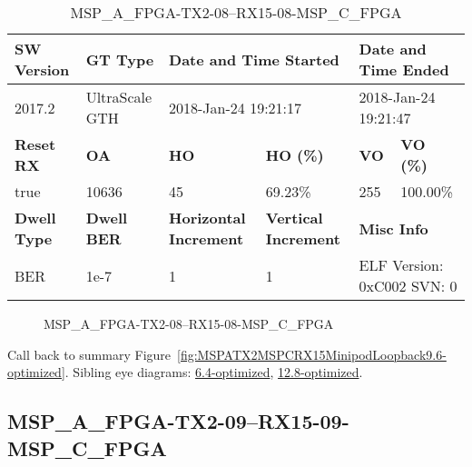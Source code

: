 \begin{table}[h]
\centering
\caption{MSP\_A\_FPGA-TX2-08--RX15-08-MSP\_C\_FPGA}
\label{tab:MSPAFPGATX208RX1508MSPCFPGA9.6-optimized}
\begin{tabular}{@{}|l|l|l|l|l|l|@{}}
\toprule
\textbf{SW Version}                & \textbf{GT Type}   & \multicolumn{2}{l|}{\textbf{Date and Time Started}}            & \multicolumn{2}{l|}{\textbf{Date and Time Ended}}        \\ \midrule
2017.2                       & UltraScale GTH          & \multicolumn{2}{l|}{2018-Jan-24 19:21:17}                   & \multicolumn{2}{l|}{2018-Jan-24 19:21:47}               \\ \midrule
\textbf{Reset RX}                  & \textbf{OA} & \textbf{HO}   & \textbf{HO (\%)} & \textbf{VO} & \textbf{VO (\%)} \\ \midrule
true & 10636        & 45          & 69.23\%        & 255        & 100.00\%       \\ \midrule
\textbf{Dwell Type}                & \textbf{Dwell BER} & \textbf{Horizontal Increment} & \textbf{Vertical Increment}    & \multicolumn{2}{l|}{\textbf{Misc Info}}                  \\ \midrule
BER                            & 1e-7        & 1        & 1           & \multicolumn{2}{l|}{ELF Version: 0xC002 SVN: 0}                         \\ \bottomrule
\end{tabular}
\end{table}

\begin{figure}[h]
\caption{MSP\_A\_FPGA-TX2-08--RX15-08-MSP\_C\_FPGA} \label{fig:MSPAFPGATX208RX1508MSPCFPGA9.6-optimized}
\end{figure}

Call back to summary Figure~\ref{fig:MSPATX2MSPCRX15MinipodLoopback9.6-optimized}.
Sibling eye diagrams: \hyperref[sec:MSPAFPGATX208RX1508MSPCFPGA6.4-optimized]{6.4-optimized}, \hyperref[sec:MSPAFPGATX208RX1508MSPCFPGA12.8-optimized]{12.8-optimized}.

\clearpage
\newpage


\subsection{MSP\_A\_FPGA-TX2-09--RX15-09-MSP\_C\_FPGA}\label{sec:MSPAFPGATX209RX1509MSPCFPGA9.6-optimized}

